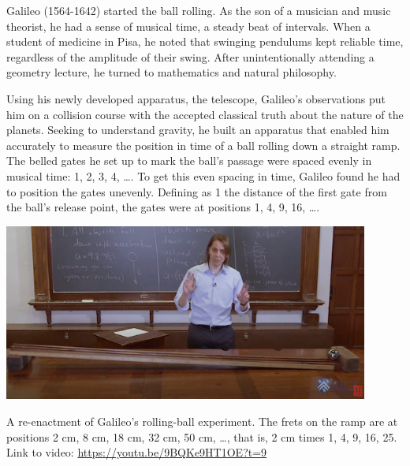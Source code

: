 \documentclass[
  letterpaper,
  DIV=11,
  numbers=noendperiod,
  oneside]{scrreprt}
\begin{document}
Galileo (1564-1642) started the ball rolling. As the son of a musician and music theorist, he had a
sense of musical time, a steady beat of intervals. When a student of
medicine in Pisa, he noted that swinging pendulums kept reliable time,
regardless of the amplitude of their swing. After unintentionally
attending a geometry lecture, he turned to mathematics and natural
philosophy.

Using his newly developed apparatus, the telescope, Galileo's
observations put him on a collision course with the accepted classical
truth about the nature of the planets. Seeking to understand gravity, he
built an apparatus that enabled him accurately to measure the position
in time of a ball rolling down a straight ramp. The belled gates he set
up to mark the ball's passage were spaced evenly in musical time: 1, 2,
3, 4, \ldots. To get this even spacing in time, Galileo found he had to
position the gates unevenly. Defining as 1 the distance of the first
gate from the ball's release point, the gates were at positions 1, 4, 9,
16, \ldots.


\begin{marginfigure}

{\centering \includegraphics[width=0.9\textwidth,height=\textheight]{Differentiation/www/galileo-reinactment.png}

}

\caption{\label{fig-galileo-reinactment}A re-enactment of Galileo's
rolling-ball experiment. The frets on the ramp are at positions 2 cm, 8
cm, 18 cm, 32 cm, 50 cm, \ldots, that is, 2 cm times 1, 4, 9, 16, 25.
Link to video: \url{https://youtu.be/9BQKe9HT1OE?t=9}}

\end{marginfigure}
\end{document}
